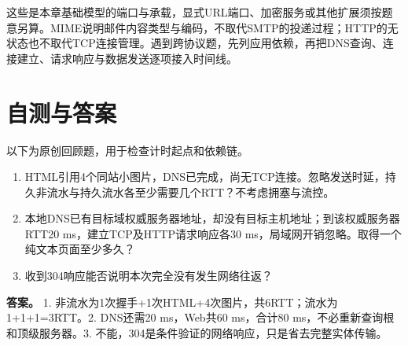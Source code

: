 这些是本章基础模型的端口与承载，显式URL端口、加密服务或其他扩展须按题意另算。MIME说明邮件内容类型与编码，不取代SMTP的投递过程；HTTP的无状态也不取代TCP连接管理。遇到跨协议题，先列应用依赖，再把DNS查询、连接建立、请求响应与数据发送逐项接入时间线。

\section{自测与答案}\label{cn-ch6-review}

以下为原创回顾题，用于检查计时起点和依赖链。

\begin{enumerate}
\def\labelenumi{\arabic{enumi}.}
\tightlist
\item
  HTML引用4个同站小图片，DNS已完成，尚无TCP连接。忽略发送时延，持久非流水与持久流水各至少需要几个RTT？不考虑拥塞与流控。
\item
  本地DNS已有目标域权威服务器地址，却没有目标主机地址；到该权威服务器RTT20 ms，建立TCP及HTTP请求响应各30 ms，局域网开销忽略。取得一个纯文本页面至少多久？
\item
  收到304响应能否说明本次完全没有发生网络往返？
\end{enumerate}

\textbf{答案。} 1. 非流水为1次握手+1次HTML+4次图片，共6RTT；流水为1+1+1=3RTT。2. DNS还需20 ms，Web共60 ms，合计80 ms，不必重新查询根和顶级服务器。3. 不能，304是条件验证的网络响应，只是省去完整实体传输。
